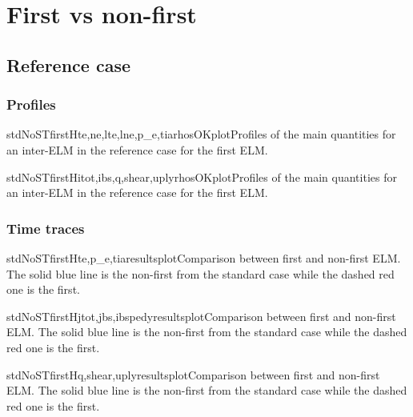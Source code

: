 \section{First vs non-first}\label{sec:app:graphs:recovery:first}
\subsection{Reference case}\label{sec:app:graphs:recovery:first:std}
\subsubsection{Profiles}\label{sec:app:graphs:recovery:first:std:profs}
\begin{AllFigs}{stdNoSTfirst}{H}{}{te,ne,lte,lne,p_e,ti}{a}{rhosOKplot}{Profiles of the main quantities for an inter-ELM in the reference case for the first ELM.}
\end{AllFigs}

\begin{AllFigs}{stdNoSTfirst}{H}{}{itot,ibs,q,shear,upl}{y}{rhosOKplot}{Profiles of the main quantities for an inter-ELM in the reference case for the first ELM.}
\end{AllFigs}
\subsubsection{Time traces}\label{sec:app:graphs:recovery:first:std:traces}
\begin{AllFigs}{stdNoSTfirst}{H}{}{te,p_e,ti}{a}{resultsplot}{Comparison between first and non-first ELM. The solid blue line is the non-first from the standard case while the dashed red one is the first.}
\end{AllFigs}

\begin{AllFigs}{stdNoSTfirst}{H}{}{jtot,jbs,ibsped}{y}{resultsplot}{Comparison between first and non-first ELM. The solid blue line is the non-first from the standard case while the dashed red one is the first.}
\end{AllFigs}

\begin{AllFigs}{stdNoSTfirst}{H}{}{q,shear,upl}{y}{resultsplot}{Comparison between first and non-first ELM. The solid blue line is the non-first from the standard case while the dashed red one is the first.}
\end{AllFigs}
